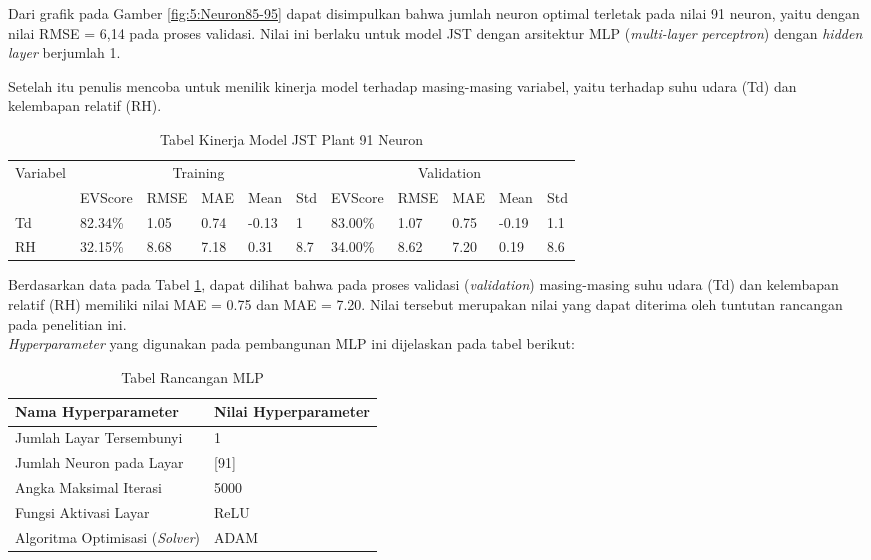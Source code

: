Dari grafik pada Gamber \ref{fig:5:Neuron85-95} dapat disimpulkan bahwa jumlah neuron optimal terletak pada nilai 91 neuron, yaitu dengan nilai RMSE = 6,14 pada proses validasi. Nilai ini berlaku untuk model JST dengan arsitektur MLP (\textit{multi-layer perceptron}) dengan \textit{hidden layer} berjumlah 1.

Setelah itu penulis mencoba untuk menilik kinerja model terhadap masing-masing variabel, yaitu terhadap suhu udara (Td) dan kelembapan relatif (RH).
\begin{table}[!h]
	\caption{Tabel Kinerja Model JST Plant 91 Neuron}
	\label{tbl:5:Performance}
	\centering
	\begin{tabular}{|p{1.3cm}|p{1.4cm}|p{1cm}|p{0.8cm}|p{0.9cm}|p{0.5cm}|p{1.4cm}|p{1cm}|p{0.8cm}|p{0.9cm}|p{0.5cm}|}
		\hline
		\multirow{2}{*}{Variabel} & \multicolumn{5}{|c|}{Training} & \multicolumn{5}{|c|}{Validation} \\
		\cline{2-11}	
		& EVScore & RMSE & MAE & Mean & Std & EVScore & RMSE & MAE & Mean & Std \\
		\hline
		Td & 82.34\% & 1.05 & 0.74 & -0.13 & 1 & 83.00\% & 1.07 &  0.75 & -0.19 & 1.1 \\
		\hline
		RH & 32.15\% & 8.68 & 7.18 & 0.31 & 8.7 & 34.00\% & 8.62 & 7.20 & 0.19 & 8.6 \\
		\hline
	\end{tabular}
\end{table}

Berdasarkan data pada Tabel \ref{tbl:5:Performance}, dapat dilihat bahwa pada proses validasi (\textit{validation}) masing-masing suhu udara (Td) dan kelembapan relatif (RH) memiliki nilai MAE = 0.75 dan MAE = 7.20. Nilai tersebut merupakan nilai yang dapat diterima oleh tuntutan rancangan pada penelitian ini.\\

\textit{Hyperparameter} yang digunakan pada pembangunan MLP ini dijelaskan pada tabel berikut:

\begin{table}[!h]
	\caption{Tabel Rancangan MLP}
	\label{tbl:5:MLPDesign}
	\centering
	\begin{tabular}{|p{5.7cm}|p{5cm}|}
		\hline
		\textbf{Nama Hyperparameter} & \textbf{Nilai Hyperparameter} \\
		\hline
		Jumlah Layar Tersembunyi & 1 \\
		\hline
		Jumlah Neuron pada Layar & [91] \\
		\hline
		Angka Maksimal Iterasi & 5000 \\
		\hline
		Fungsi Aktivasi Layar & ReLU \\
		\hline
		Algoritma Optimisasi (\textit{Solver}) & ADAM \\
		\hline
	\end{tabular}
\end{table}

